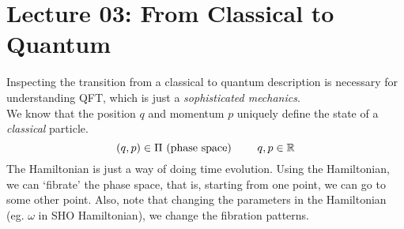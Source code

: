 \section*{Lecture 03: From Classical to Quantum}
Inspecting the transition from a classical to quantum description is necessary for understanding QFT, which is just a \textit{sophisticated mechanics}. \\[0.2cm]
We know that the position $q$ and momentum $p$ uniquely define the state of a \textit{classical} particle. $$(q,p)\in \Pi \ \text{(phase space) }\qquad q,p\in \mathbb{R}$$
The Hamiltonian is just a way of doing time evolution. Using the Hamiltonian, we can `fibrate' the phase space, that is, starting from one point, we can go to some other point. Also, note that changing the parameters in the Hamiltonian (eg. $\omega$ in SHO Hamiltonian), we change the fibration patterns. 



